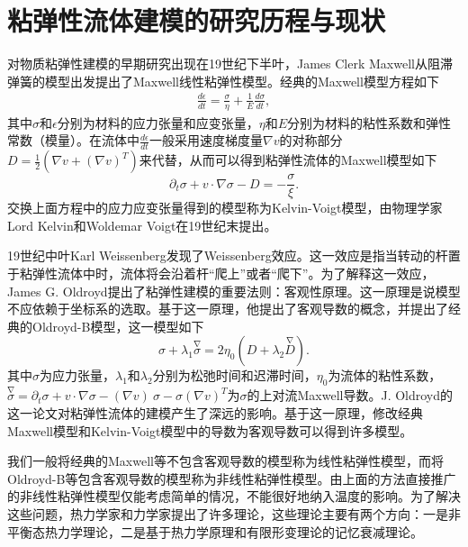 
\section{粘弹性流体建模的研究历程与现状}
对物质粘弹性建模的早期研究出现在19世纪下半叶，James Clerk Maxwell从阻滞弹簧的模型出发提出了Maxwell线性粘弹性模型\cite{maxwell2013scientific}。经典的Maxwell模型方程如下
\begin{eqnarray*}
\frac {d\epsilon} {dt} = \frac {\sigma} {\eta} + \frac {1} {E} \frac {d\sigma} {dt},
\end{eqnarray*}
其中$\sigma$和$\epsilon$分别为材料的应力张量和应变张量，$\eta$和$E$分别为材料的粘性系数和弹性常数（模量）。在流体中$\frac {d\epsilon} {dt}$一般采用速度梯度量$\nabla v$的对称部分$D=\frac{1}{2} (\nabla v + (\nabla v)^T)$来代替，从而可以得到粘弹性流体的Maxwell模型如下
\begin{equation} \label{eq:maxwell}
			\partial_t \sigma + v \cdot \nabla \sigma - D = -\frac{\sigma}{\xi}. 
\end{equation}
交换上面方程中的应力应变张量得到的模型称为Kelvin-Voigt模型，由物理学家Lord Kelvin和Woldemar Voigt在19世纪末提出\cite{kelvin1887stability}。

19世纪中叶Karl Weissenberg发现了Weissenberg效应。这一效应是指当转动的杆置于粘弹性流体中时，流体将会沿着杆“爬上”或者“爬下”\cite{weissenberg1947continuum}。为了解释这一效应，James G. Oldroyd提出了粘弹性建模的重要法则：客观性原理。这一原理是说模型不应依赖于坐标系的选取。基于这一原理，他提出了客观导数的概念，并提出了经典的Oldroyd-B模型，这一模型如下
\begin{equation} \label{eq:Oldroyd}
	{\sigma} + \lambda_1 \stackrel{\nabla}{{\sigma}} = 2\eta_0 ({D} + \lambda_2 \stackrel{\nabla}{{D}}).
\end{equation}
其中$\sigma$为应力张量，$\lambda_1$和$\lambda_2$分别为松弛时间和迟滞时间，$\eta_0$为流体的粘性系数，${\stackrel{\nabla} \sigma}= \partial_t \sigma + v \cdot \nabla \sigma - (\nabla v)\  \sigma - \sigma (\nabla v)^T$为$\sigma$的上对流Maxwell导数\cite{oldroyd1950formulation}。J. Oldroyd的这一论文对粘弹性流体的建模产生了深远的影响。基于这一原理，修改经典Maxwell模型和Kelvin-Voigt模型中的导数为客观导数可以得到许多模型\cite{lin2005hydrodynamics,larson1999structure}。

我们一般将经典的Maxwell等不包含客观导数的模型称为线性粘弹性模型，而将Oldroyd-B等包含客观导数的模型称为非线性粘弹性模型。由上面的方法直接推广的非线性粘弹性模型仅能考虑简单的情况，不能很好地纳入温度的影响。为了解决这些问题，热力学家和力学家提出了许多理论，这些理论主要有两个方向：一是非平衡态热力学理论\cite{jou1996extended,ottinger2005beyond,zhu2014conservation}，二是基于热力学原理和有限形变理论的记忆衰减理论\cite{coleman1961foundations,truesdell2012rational}。

